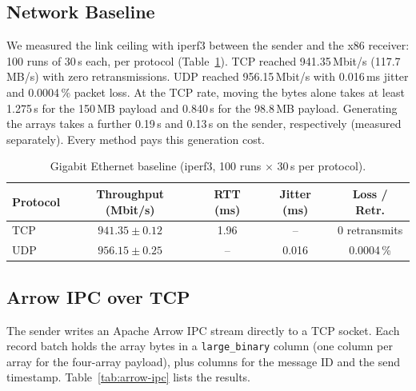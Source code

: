 \subsection{Network Baseline}
\label{sec:res-baseline}

We measured the link ceiling with iperf3 between the sender and the x86 receiver:
100 runs of 30\,s each, per protocol (Table~\ref{tab:baseline}). TCP reached
941.35\,Mbit/s (117.7\,MB/s) with zero retransmissions. UDP reached 956.15\,Mbit/s
with 0.016\,ms jitter and 0.0004\,\% packet loss. At the TCP rate, moving the bytes
alone takes at least 1.275\,s for the 150\,MB payload and 0.840\,s for the 98.8\,MB
payload. Generating the arrays takes a further 0.19\,s and 0.13\,s on the sender,
respectively (measured separately). Every method pays this generation cost.

\begin{table}[t]
  \centering
  \caption{Gigabit Ethernet baseline (iperf3, 100 runs $\times$ 30\,s per protocol).}
  \label{tab:baseline}
  \small
  \begin{tabular}{lcccc}
    \toprule
    Protocol & Throughput (Mbit/s) & RTT (ms) & Jitter (ms) & Loss / Retr. \\
    \midrule
    TCP & $941.35 \pm 0.12$ & 1.96 & -- & 0 retransmits \\
    UDP & $956.15 \pm 0.25$ & -- & 0.016 & 0.0004\,\% \\
    \bottomrule
  \end{tabular}
\end{table}

\subsection{Arrow IPC over TCP}
\label{sec:res-arrow-ipc}

The sender writes an Apache Arrow IPC stream directly to a TCP socket. Each record
batch holds the array bytes in a \texttt{large\_binary} column (one column per array
for the four-array payload), plus columns for the message ID and the send timestamp.
Table~\ref{tab:arrow-ipc} lists the results.

